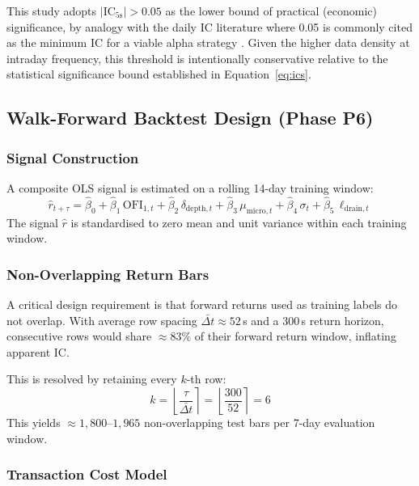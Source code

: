 \documentclass[12pt,a4paper]{article}
\theoremstyle{definition}
\theoremstyle{remark}
\newcommand{\IC}{\mathrm{IC}}
\newcommand{\OFI}{\mathrm{OFI}}
\begin{document}
This study adopts $|\IC_{5\text{s}}| > 0.05$ as the lower bound of
practical (economic) significance, by analogy with the daily IC
literature where 0.05 is commonly cited as the minimum IC for a
viable alpha strategy \citep{grinold1999active}. Given the higher
data density at intraday frequency, this threshold is intentionally
conservative relative to the statistical significance bound
established in Equation~\eqref{eq:ics}.

\subsection{Walk-Forward Backtest Design (Phase P6)}
\label{sec:backtest_design}

\subsubsection{Signal Construction}

A composite OLS signal is estimated on a rolling 14-day training window:
\begin{equation}
  \hat{r}_{t+\tau} = \hat{\beta}_0
    + \hat{\beta}_1\,\OFI_{1,t}
    + \hat{\beta}_2\,\delta_{\mathrm{depth},t}
    + \hat{\beta}_3\,\mu_{\mathrm{micro},t}
    + \hat{\beta}_4\,\sigma_t
    + \hat{\beta}_5\,\ell_{\mathrm{drain},t}
\label{eq:signal}
\end{equation}
The signal $\hat{r}$ is standardised to zero mean and unit variance
within each training window.

\subsubsection{Non-Overlapping Return Bars}

A critical design requirement is that forward returns used as training
labels do not overlap. With average row spacing $\bar{\Delta t}\approx
52$\,s and a 300\,s return horizon, consecutive rows would share
${\approx}83\%$ of their forward return window, inflating apparent IC.

This is resolved by retaining every $k$-th row:
\begin{equation}
  k = \left\lfloor\frac{\tau}{\bar{\Delta t}}\right\rceil
    = \left\lfloor\frac{300}{52}\right\rceil = 6
\end{equation}
This yields ${\approx}1{,}800$--$1{,}965$ non-overlapping test bars
per 7-day evaluation window.

\subsubsection{Transaction Cost Model}
\end{document}
